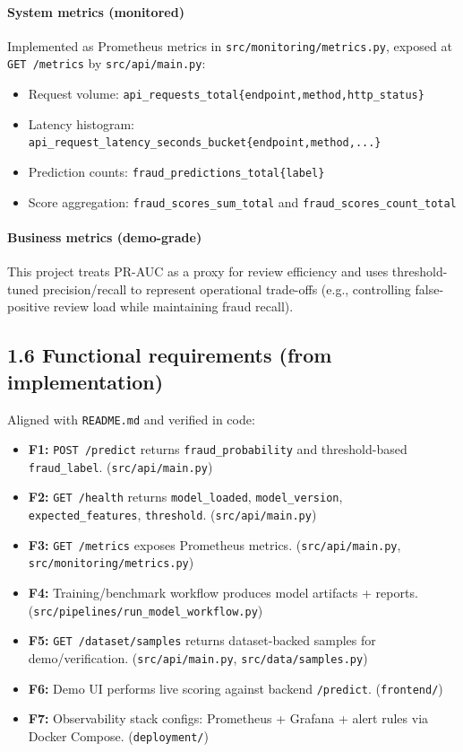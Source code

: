 \documentclass[11pt]{article}
\newcommand{\code}[1]{\texttt{#1}}
\begin{document}
\paragraph{System metrics (monitored)}
Implemented as Prometheus metrics in \code{src/monitoring/metrics.py}, exposed at \code{GET /metrics} by \code{src/api/main.py}:
\begin{itemize}
  \item Request volume: \code{api\_requests\_total\{endpoint,method,http\_status\}}
  \item Latency histogram: \code{api\_request\_latency\_seconds\_bucket\{endpoint,method,...\}}
  \item Prediction counts: \code{fraud\_predictions\_total\{label\}}
  \item Score aggregation: \code{fraud\_scores\_sum\_total} and \code{fraud\_scores\_count\_total}
\end{itemize}

\paragraph{Business metrics (demo-grade)}
This project treats PR-AUC as a proxy for review efficiency and uses threshold-tuned precision/recall to represent operational trade-offs (e.g., controlling false-positive review load while maintaining fraud recall).

\subsection*{1.6 Functional requirements (from implementation)}
Aligned with \code{README.md} and verified in code:
\begin{itemize}
  \item \textbf{F1:} \code{POST /predict} returns \code{fraud\_probability} and threshold-based \code{fraud\_label}. (\code{src/api/main.py})
  \item \textbf{F2:} \code{GET /health} returns \code{model\_loaded}, \code{model\_version}, \code{expected\_features}, \code{threshold}. (\code{src/api/main.py})
  \item \textbf{F3:} \code{GET /metrics} exposes Prometheus metrics. (\code{src/api/main.py}, \code{src/monitoring/metrics.py})
  \item \textbf{F4:} Training/benchmark workflow produces model artifacts + reports. (\code{src/pipelines/run\_model\_workflow.py})
  \item \textbf{F5:} \code{GET /dataset/samples} returns dataset-backed samples for demo/verification. (\code{src/api/main.py}, \code{src/data/samples.py})
  \item \textbf{F6:} Demo UI performs live scoring against backend \code{/predict}. (\code{frontend/})
  \item \textbf{F7:} Observability stack configs: Prometheus + Grafana + alert rules via Docker Compose. (\code{deployment/})
\end{itemize}
\end{document}
